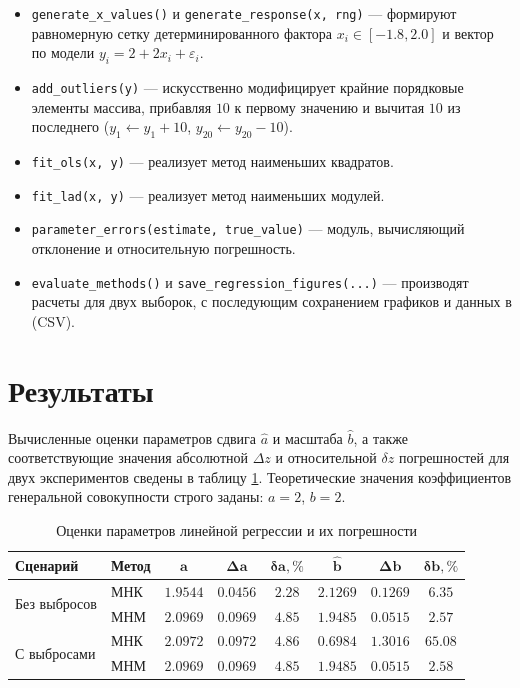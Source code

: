 \documentclass[a4paper, 14pt]{extarticle}
\begin{document}
\begin{itemize}
    \item \texttt{generate\_x\_values()} и \texttt{generate\_response(x, rng)} --- формируют равномерную сетку детерминированного фактора $x_i \in [-1.8, 2.0]$ и вектор по модели $y_i = 2 + 2x_i + \varepsilon_i$.
    \item \texttt{add\_outliers(y)} --- искусственно модифицирует крайние порядковые элементы массива, прибавляя $10$ к первому значению и вычитая $10$ из последнего ($y_1 \leftarrow y_1 + 10$, $y_{20} \leftarrow y_{20} - 10$).
    \item \texttt{fit\_ols(x, y)} --- реализует метод наименьших квадратов.
    \item \texttt{fit\_lad(x, y)} --- реализует метод наименьших модулей.
    \item \texttt{parameter\_errors(estimate, true\_value)} --- модуль, вычисляющий отклонение и относительную погрешность.
    \item \texttt{evaluate\_methods()} и \texttt{save\_regression\_figures(...)} --- производят расчеты для двух выборок, с последующим сохранением графиков и данных в (CSV).
\end{itemize}

\section{Результаты}

Вычисленные оценки параметров сдвига $\hat{a}$ и масштаба $\hat{b}$, а также соответствующие значения абсолютной $\Delta z$ и относительной $\delta z$ погрешностей для двух экспериментов сведены в таблицу \ref{tab:reg_results}. Теоретические значения коэффициентов генеральной совокупности строго заданы: $a = 2$, $b = 2$.

\begin{table}[H]
    \centering
    \caption{Оценки параметров линейной регрессии и их погрешности}
    \label{tab:reg_results}
    \begin{tabular}{|l|l|c|c|c|c|c|c|}
        \hline
        \textbf{Сценарий} & \textbf{Метод} & $\mathbf{\hat{a}}$ & $\mathbf{\Delta a}$ & $\mathbf{\delta a, \%}$ & $\mathbf{\hat{b}}$ & $\mathbf{\Delta b}$ & $\mathbf{\delta b, \%}$ \\ \hline
        \multirow{2}{*}{Без выбросов} 
        & МНК & $1.9544$ & $0.0456$ & $2.28$ & $2.1269$ & $0.1269$ & $6.35$ \\ \cline{2-8}
        & МНМ & $2.0969$ & $0.0969$ & $4.85$ & $1.9485$ & $0.0515$ & $2.57$ \\ \hline
        \multirow{2}{*}{С выбросами} 
        & МНК & $2.0972$ & $0.0972$ & $4.86$ & $0.6984$ & $1.3016$ & $65.08$ \\ \cline{2-8}
        & МНМ & $2.0969$ & $0.0969$ & $4.85$ & $1.9485$ & $0.0515$ & $2.58$ \\ \hline
    \end{tabular}
\end{table}
\end{document}
